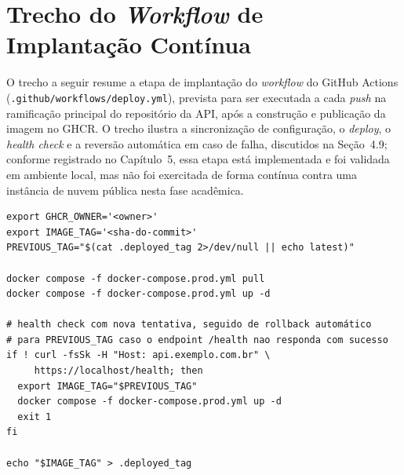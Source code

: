 \chapter{Trecho do \textit{Workflow} de Implantação Contínua}
\label{apendiceWorkflow}

O trecho a seguir resume a etapa de implantação do \textit{workflow} do GitHub Actions (\texttt{.github/workflows/deploy.yml}), prevista para ser executada a cada \textit{push} na ramificação principal do repositório da API, após a construção e publicação da imagem no GHCR. O trecho ilustra a sincronização de configuração, o \textit{deploy}, o \textit{health check} e a reversão automática em caso de falha, discutidos na Seção~4.9; conforme registrado no Capítulo~5, essa etapa está implementada e foi validada em ambiente local, mas não foi exercitada de forma contínua contra uma instância de nuvem pública nesta fase acadêmica.

\begin{verbatim}
export GHCR_OWNER='<owner>'
export IMAGE_TAG='<sha-do-commit>'
PREVIOUS_TAG="$(cat .deployed_tag 2>/dev/null || echo latest)"

docker compose -f docker-compose.prod.yml pull
docker compose -f docker-compose.prod.yml up -d

# health check com nova tentativa, seguido de rollback automático
# para PREVIOUS_TAG caso o endpoint /health nao responda com sucesso
if ! curl -fsSk -H "Host: api.exemplo.com.br" \
     https://localhost/health; then
  export IMAGE_TAG="$PREVIOUS_TAG"
  docker compose -f docker-compose.prod.yml up -d
  exit 1
fi

echo "$IMAGE_TAG" > .deployed_tag
\end{verbatim}
